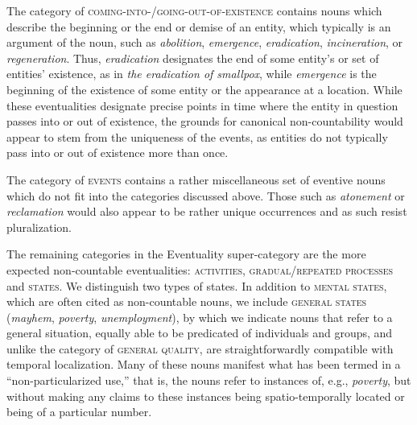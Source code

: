 \documentclass[output=paper]{langscibook}
\begin{document}
The category of \textsc{coming-into-/going-out-of-existence} contains nouns which describe the beginning or the end or demise of an entity, which typically is an argument of the noun, such as \textit{abolition}, \textit{emergence}, \textit{eradication}, \textit{incineration}, or \textit{regeneration}.  Thus, \textit{eradication} designates the end of some entity's or set of entities' existence, as in \textit{the eradication of smallpox}, while \textit{emergence} is the beginning of the existence of some entity or the appearance at a location.  While these eventualities designate precise points in time where the entity in question passes into or out of existence, the grounds for canonical non-countability would appear to stem from the uniqueness of the events, as entities do not typically pass into or out of existence more than once.%

The category of \textsc{events} contains a rather miscellaneous set of eventive nouns which do not fit into the categories discussed above.  Those such as  \textit{atonement} or \textit{reclamation} would also appear to be rather unique occurrences and as such resist pluralization. 


The remaining categories in the Eventuality super-category are the more expected non-countable eventualities: \textsc{activities}, \textsc{gradual/repeated processes} and \textsc{states}. We distinguish two types of states.  In addition to \textsc{mental states}, which are often cited as non-countable nouns, we include \textsc{general states} (\textit{mayhem}, \textit{poverty}, \textit{unemployment}), by which we indicate nouns that refer to a general situation, equally able to be predicated of individuals and groups, and unlike the category of \textsc{general quality}, are straightforwardly compatible with temporal localization.   Many of these nouns manifest what has been termed in \citet{grimm2016crime} a ``non-particularized use,'' that is, the nouns refer to instances of, e.g., \textit{poverty}, but without making any claims to these instances being spatio-temporally located or being of a particular number.






\end{document}
